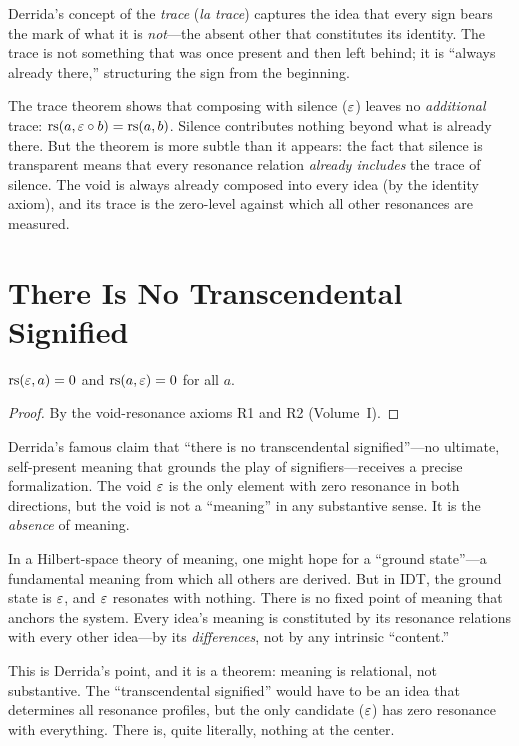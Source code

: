 \begin{interpretation}
\label{interp:trace}
Derrida's concept of the \emph{trace} (\textit{la trace}) captures the idea
that every sign bears the mark of what it is \emph{not}---the absent other that
constitutes its identity. The trace is not something that was once present and
then left behind; it is ``always already there,'' structuring the sign from
the beginning.

The trace theorem shows that composing with silence ($\varepsilon$) leaves no
\emph{additional} trace: $\mathrm{rs}(a, \varepsilon \circ b) = \mathrm{rs}(a, b)$. Silence
contributes nothing beyond what is already there. But the theorem is more
subtle than it appears: the fact that silence is transparent means that every
resonance relation \emph{already includes} the trace of silence. The void is
always already composed into every idea (by the identity axiom), and its trace
is the zero-level against which all other resonances are measured.
\end{interpretation}

\section{There Is No Transcendental Signified}

\begin{theorem}
\label{thm:void-not-meaning}
$\mathrm{rs}(\varepsilon, a) = 0$ and $\mathrm{rs}(a, \varepsilon) = 0$ for all $a$.
\end{theorem}

\begin{proof}
By the void-resonance axioms R1 and R2 (Volume~I).
\end{proof}

\begin{interpretation}
\label{interp:no-signified}
Derrida's famous claim that ``there is no transcendental signified''---no
ultimate, self-present meaning that grounds the play of signifiers---receives a
precise formalization. The void $\varepsilon$ is the only element with zero resonance
in both directions, but the void is not a ``meaning'' in any substantive sense.
It is the \emph{absence} of meaning.

In a Hilbert-space theory of meaning, one might hope for a ``ground state''---a
fundamental meaning from which all others are derived. But in IDT, the ground
state is $\varepsilon$, and $\varepsilon$ resonates with nothing. There is no fixed point
of meaning that anchors the system. Every idea's meaning is constituted by its
resonance relations with every other idea---by its \emph{differences}, not by
any intrinsic ``content.''

This is Derrida's point, and it is a theorem: meaning is relational, not
substantive. The ``transcendental signified'' would have to be an idea that
determines all resonance profiles, but the only candidate ($\varepsilon$) has zero
resonance with everything. There is, quite literally, nothing at the center.
\end{interpretation}

